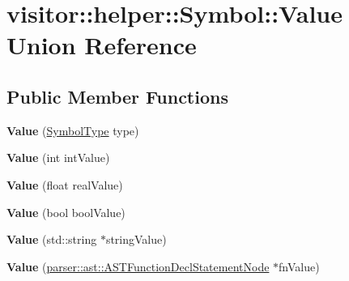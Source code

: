 \hypertarget{unionvisitor_1_1helper_1_1Symbol_1_1Value}{}\section{visitor\+:\+:helper\+:\+:Symbol\+:\+:Value Union Reference}
\label{unionvisitor_1_1helper_1_1Symbol_1_1Value}
\subsection*{Public Member Functions}
\begin{DoxyCompactItemize}
\item 
\mbox{\label{unionvisitor_1_1helper_1_1Symbol_1_1Value_a44b27d313e4411eec73e91125932a526}} 
{\bfseries Value} (\hyperlink{ASTVariableDeclStatementNode_8h_a1e8e1bde0729627e3a22ffa858d5f3b9}{Symbol\+Type} type)
\item 
\mbox{\label{unionvisitor_1_1helper_1_1Symbol_1_1Value_af60b85931340521532521b5a6776b132}} 
{\bfseries Value} (int int\+Value)
\item 
\mbox{\label{unionvisitor_1_1helper_1_1Symbol_1_1Value_ac1463b84f7ef944747f12892ce971f1b}} 
{\bfseries Value} (float real\+Value)
\item 
\mbox{\label{unionvisitor_1_1helper_1_1Symbol_1_1Value_ab0202ad4cd1800b49a510d77035932aa}} 
{\bfseries Value} (bool bool\+Value)
\item 
\mbox{\label{unionvisitor_1_1helper_1_1Symbol_1_1Value_a85f77af4b33495e2e85d38118eff28d3}} 
{\bfseries Value} (std\+::string $\ast$string\+Value)
\item 
\mbox{\label{unionvisitor_1_1helper_1_1Symbol_1_1Value_abeaaae4c1fcb08f0b64e3b7e2f2006cc}} 
{\bfseries Value} (\hyperlink{classparser_1_1ast_1_1ASTFunctionDeclStatementNode}{parser\+::ast\+::\+A\+S\+T\+Function\+Decl\+Statement\+Node} $\ast$fn\+Value)
\end{DoxyCompactItemize}
